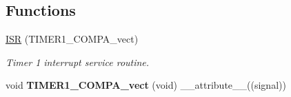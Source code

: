 \subsection*{Functions}
\begin{DoxyCompactItemize}
\item 
\hyperlink{group___engduino_protocol_gad39420cdd896dd12c68e36313139d0a5}{I\+S\+R} (T\+I\+M\+E\+R1\+\_\+\+C\+O\+M\+P\+A\+\_\+vect)
\begin{DoxyCompactList}\small\item\em Timer 1 interrupt service routine. \end{DoxyCompactList}\item 
\hypertarget{group___engduino_protocol_ga27f59876241368773edbf21774bd555e}{}void {\bfseries T\+I\+M\+E\+R1\+\_\+\+C\+O\+M\+P\+A\+\_\+vect} (void) \+\_\+\+\_\+attribute\+\_\+\+\_\+((signal))\label{group___engduino_protocol_ga27f59876241368773edbf21774bd555e}


\end{DoxyCompactItemize}
